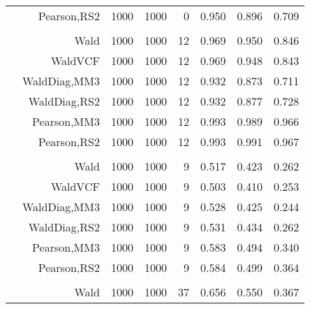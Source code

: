 \documentclass[
]{article}
\begin{document}
\begin{table}[H]
{\begin{tabular}[t]{lrrrrrrr}
\hspace{1em} & Pearson,RS2 & 1000 & 1000 & 0 & 0.950 & 0.896 & 0.709\\
\cmidrule{1-8}
\addlinespace[0.3em]
\multicolumn{8}{l}{\textbf{1F 15V}}\\
\hspace{1em} & Wald & 1000 & 1000 & 12 & 0.969 & 0.950 & 0.846\\

\hspace{1em} & WaldVCF & 1000 & 1000 & 12 & 0.969 & 0.948 & 0.843\\

\hspace{1em} & WaldDiag,MM3 & 1000 & 1000 & 12 & 0.932 & 0.873 & 0.711\\

\hspace{1em} & WaldDiag,RS2 & 1000 & 1000 & 12 & 0.932 & 0.877 & 0.728\\

\hspace{1em} & Pearson,MM3 & 1000 & 1000 & 12 & 0.993 & 0.989 & 0.966\\

\hspace{1em} & Pearson,RS2 & 1000 & 1000 & 12 & 0.993 & 0.991 & 0.967\\
\cmidrule{1-8}
\addlinespace[0.3em]
\multicolumn{8}{l}{\textbf{2F 10V}}\\
\hspace{1em} & Wald & 1000 & 1000 & 9 & 0.517 & 0.423 & 0.262\\

\hspace{1em} & WaldVCF & 1000 & 1000 & 9 & 0.503 & 0.410 & 0.253\\

\hspace{1em} & WaldDiag,MM3 & 1000 & 1000 & 9 & 0.528 & 0.425 & 0.244\\

\hspace{1em} & WaldDiag,RS2 & 1000 & 1000 & 9 & 0.531 & 0.434 & 0.262\\

\hspace{1em} & Pearson,MM3 & 1000 & 1000 & 9 & 0.583 & 0.494 & 0.340\\

\hspace{1em} & Pearson,RS2 & 1000 & 1000 & 9 & 0.584 & 0.499 & 0.364\\
\cmidrule{1-8}
\addlinespace[0.3em]
\multicolumn{8}{l}{\textbf{3F 15V}}\\
\hspace{1em} & Wald & 1000 & 1000 & 37 & 0.656 & 0.550 & 0.367\\


\end{tabular}}
\end{table}
\end{document}
